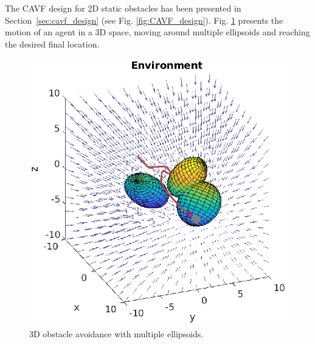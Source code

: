 The CAVF design for 2D static obstacles has been presented in Section~\ref{sec:cavf_design} (see Fig. \ref{fig:CAVF_design}). Fig. \ref{fig:multiellipsoid} presents the motion of an agent in a 3D space, moving around multiple ellipsoids and reaching the desired final location.

\begin{figure}[H]
  \centering
  \includegraphics[width=1\linewidth]{img/multiellipsoid.eps}
  \caption{3D obstacle avoidance with multiple ellipsoids.}
  \label{fig:multiellipsoid}
\end{figure}

